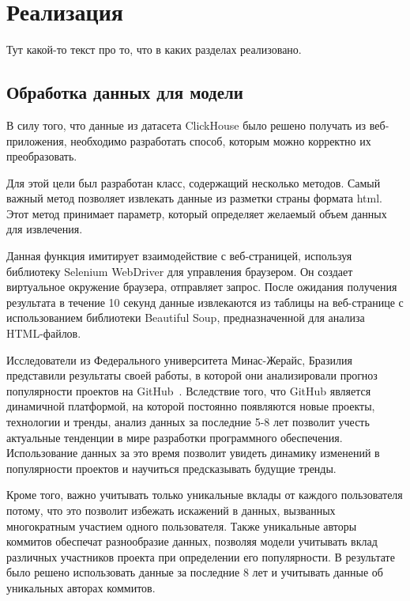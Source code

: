 \newpage
\section{Реализация}
\label{sec:Realization}

Тут какой-то текст про то, что в каких разделах реализовано.

\subsection{Обработка данных для модели}
\label{subsec:Parser}

В силу того, что данные из датасета ClickHouse было решено получать из веб-приложения, необходимо разработать способ, которым можно корректно их преобразовать.

Для этой цели был разработан класс, содержащий несколько методов. Самый важный метод позволяет извлекать данные из разметки страны формата html. Этот метод принимает параметр, который определяет желаемый объем данных для извлечения. 

Данная функция имитирует взаимодействие с веб-страницей, используя библиотеку Selenium WebDriver для управления браузером. Он создает виртуальное окружение браузера, отправляет запрос. После ожидания получения результата в течение 10 секунд данные извлекаются из таблицы на веб-странице с использованием библиотеки Beautiful Soup, предназначенной для анализа HTML-файлов. 

Исследователи из Федерального университета Минас-Жерайс, Бразилия представили результаты своей работы, в которой они анализировали прогноз популярности проектов на GitHub~\cite{BorgesHV16}. Вследствие того, что GitHub является динамичной платформой, на которой постоянно появляются новые проекты, технологии и тренды, анализ данных за последние 5-8 лет позволит  учесть актуальные тенденции в мире разработки программного обеспечения. Использование данных за это время позволит увидеть динамику изменений в популярности проектов и научиться предсказывать будущие тренды. 

Кроме того, важно учитывать только уникальные вклады от каждого пользователя потому, что это позволит избежать искажений в данных, вызванных многократным участием одного пользователя. Также уникальные авторы коммитов обеспечат разнообразие данных, позволяя модели учитывать вклад различных участников проекта при определении его популярности. В результате было решено использовать данные за последние 8 лет и учитывать данные об уникальных авторах коммитов.

